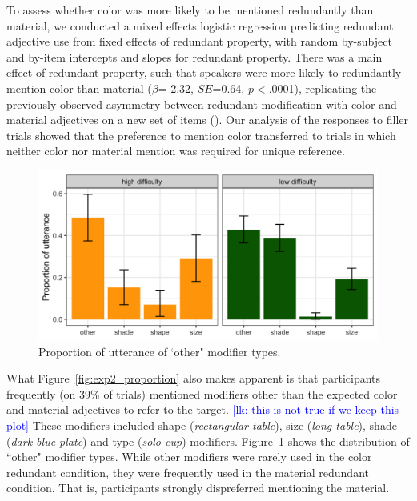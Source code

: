 \documentclass[12pt,letterpaper]{article}
\newcommand{\lk}[1]{\textcolor{Blue}{[lk: #1]}}
\begin{document}
To assess whether color was more likely to be mentioned redundantly than material, we conducted a mixed effects logistic regression predicting redundant adjective use from fixed effects of redundant property, with random by-subject and by-item intercepts and slopes for redundant property. There was a main effect of redundant property, such that speakers were more likely to redundantly mention color than material ($\beta$= 2.32, $SE$=0.64, $p$$<$.0001), replicating the previously observed asymmetry between redundant modification with color and material adjectives on a new set of items (\citealt{Sedivy2005,EttingerFernandez2020}). Our analysis of the responses to filler trials showed that the preference to mention color transferred to trials in which neither color nor material mention was required for unique reference.

\begin{figure}[ht]
   \centering
   \includegraphics[width=.8\textwidth]{plots/exp2_other_distribution.png}
   \caption{Proportion of utterance of `other" modifier types.}
   \label{fig:exp2_other}
   \end{figure}

What Figure~\ref{fig:exp2_proportion} also makes apparent is that participants frequently (on 39\% of trials) mentioned  modifiers other than the expected color and material adjectives to refer to the target. \lk{this is not true if we keep this plot} These modifiers included shape (\textit{rectangular table}), size (\textit{long table}), shade (\textit{dark blue plate}) and type (\textit{solo cup}) modifiers. Figure~\ref{fig:exp2_other} shows the distribution of ``other" modifier types. While other modifiers were rarely used in the color redundant condition, they were frequently used in the material redundant condition. That is, participants strongly dispreferred mentioning the material.

\end{document}
